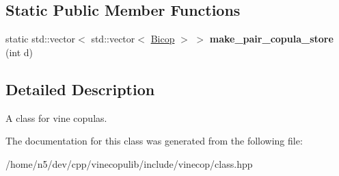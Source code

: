 \subsection*{Static Public Member Functions}
\begin{DoxyCompactItemize}
\item 
static std\+::vector$<$ std\+::vector$<$ \hyperlink{classvinecopulib_1_1_bicop}{Bicop} $>$ $>$ {\bfseries make\+\_\+pair\+\_\+copula\+\_\+store} (int d)\hypertarget{classvinecopulib_1_1_vinecop_a237cdc2972b21f7db452b07f830dc9ab}{}\label{classvinecopulib_1_1_vinecop_a237cdc2972b21f7db452b07f830dc9ab}

\end{DoxyCompactItemize}


\subsection{Detailed Description}
A class for vine copulas. 

The documentation for this class was generated from the following file\+:\begin{DoxyCompactItemize}
\item 
/home/n5/dev/cpp/vinecopulib/include/vinecop/class.\+hpp\end{DoxyCompactItemize}
